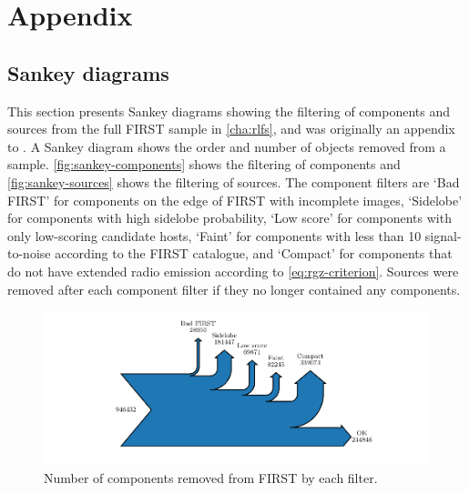 
\appendix

\chapter*{Appendix}

\renewcommand{\thefigure}{\Alph{section}.\arabic{figure}}
\renewcommand{\thetable}{\Alph{section}.\arabic{table}}
\renewcommand{\theequation}{\Alph{section}.\arabic{equation}}


  \section{Sankey diagrams}
  \label{sec:rlfs-sankey}

    This section presents Sankey diagrams showing the filtering of components and sources from the full FIRST sample in \autoref{cha:rlfs}, and was originally an appendix to \citet{alger21rlfs}. A Sankey diagram shows the order and number of objects removed from a sample. \autoref{fig:sankey-components} shows the filtering of components and \autoref{fig:sankey-sources} shows the filtering of sources. The component filters are `Bad FIRST' for components on the edge of FIRST with incomplete images, `Sidelobe' for components with high sidelobe probability, `Low score' for components with only low-scoring candidate hosts, `Faint' for components with less than 10 signal-to-noise according to the FIRST catalogue, and `Compact' for components that do not have extended radio emission according to \autoref{eq:rgz-criterion}. Sources were removed after each component filter if they no longer contained any components.

    \begin{figure}
        \centering
        \includegraphics{rlf-images/sankey_components.pdf}
        \caption{\label{fig:sankey-components} Number of components removed from FIRST by each filter.}
    \end{figure}


